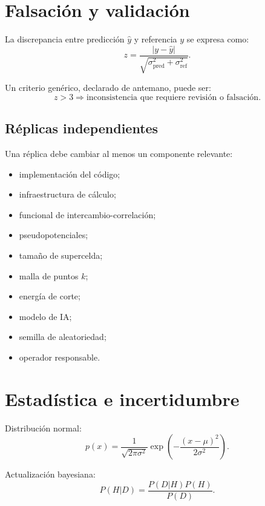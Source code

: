 \documentclass[11pt,a4paper]{article}
\begin{document}
\section{Falsación y validación}

La discrepancia entre predicción $\hat y$ y referencia $y$ se expresa como:
\begin{equation}
z
=
\frac{
|y-\hat y|
}{
\sqrt{
\sigma_{\mathrm{pred}}^{2}
+
\sigma_{\mathrm{ref}}^{2}
}
}.
\label{eq:z}
\end{equation}

Un criterio genérico, declarado de antemano, puede ser:
\begin{equation}
z > 3
\Rightarrow
\text{inconsistencia que requiere revisión o falsación}.
\end{equation}

\subsection{Réplicas independientes}

Una réplica debe cambiar al menos un componente relevante:
\begin{itemize}[itemsep=1pt]
    \item implementación del código;
    \item infraestructura de cálculo;
    \item funcional de intercambio-correlación;
    \item pseudopotenciales;
    \item tamaño de supercelda;
    \item malla de puntos $k$;
    \item energía de corte;
    \item modelo de IA;
    \item semilla de aleatoriedad;
    \item operador responsable.
\end{itemize}

\section{Estadística e incertidumbre}
\label{sec:stats}

Distribución normal:
\begin{equation}
p(x)
=
\frac{1}{\sqrt{2\pi\sigma^2}}
\exp\left(
-\frac{(x-\mu)^2}{2\sigma^2}
\right).
\end{equation}

Actualización bayesiana:
\begin{equation}
P(H|D)
=
\frac{P(D|H)P(H)}{P(D)}.
\end{equation}
\end{document}
